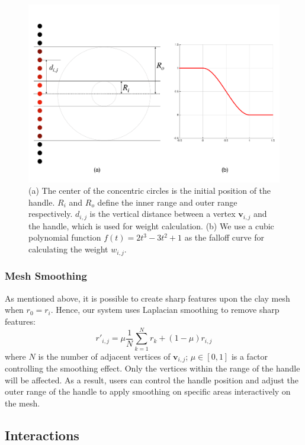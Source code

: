 \documentclass{svjour3}                     %
\begin{document}
\begin{figure}
\includegraphics[width=\textwidth]{fig8.pdf}
\caption{(a) The center of the concentric circles is the initial position of the handle. $R_{i}$ and $R_{o}$ define the inner range and outer range respectively. $d_{i,j}$ is the vertical distance between a vertex $\mathbf{v}_{i,j}$ and the handle, which is used for weight calculation. (b) We use a cubic polynomial function $f(t) = 2t^3 - 3t^2 + 1$ as the falloff curve for calculating the weight $w_{i,j}$. }
\label{fig:deform}
\end{figure}

\subsubsection{Mesh Smoothing}
\label{sec:4.2.4}
As mentioned above, it is possible to create sharp features upon the clay mesh when $r_{0} = r_{i}$. Hence, our system uses Laplacian smoothing to remove sharp features: 
\begin{equation}
r'_{i,j} = 
\mu  \frac{1}{N} 
\sum_{k=1}^N r_{k}
+ (1 - \mu)  r_{i,j}
\end{equation}
where $N$ is the number of adjacent vertices of $\mathbf{v}_{i,j}$; $\mu \in [0,1]$ is a factor controlling the smoothing effect.
Only the vertices within the range of the handle will be affected.
As a result, users can control the handle position and adjust the outer range of the handle to apply smoothing on specific areas interactively on the mesh.

\subsection{Interactions}
\label{sec:4.3}
\end{document}
